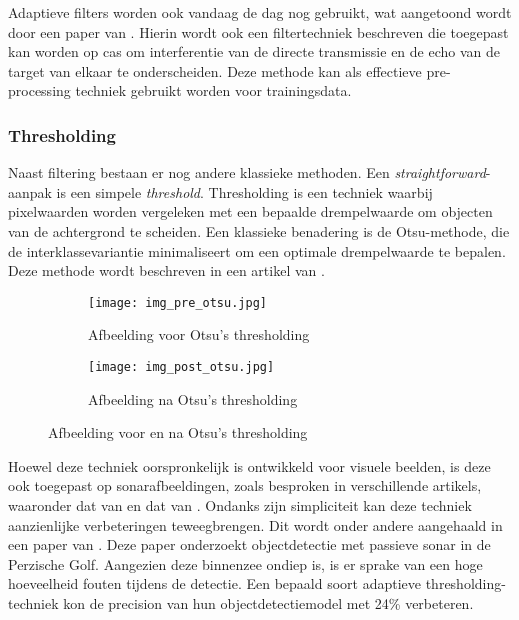 Adaptieve filters worden ook vandaag de dag nog gebruikt, wat aangetoond wordt door een paper van \textcite{Lourey_2017}. Hierin wordt ook een filtertechniek beschreven die toegepast kan worden op \gls{cas} om interferentie van de directe transmissie en de echo van de target van elkaar te onderscheiden. Deze methode kan als effectieve pre-processing techniek gebruikt worden voor trainingsdata.

\subsubsection{Thresholding}

Naast filtering bestaan er nog andere klassieke methoden. Een \emph{straightforward}-aanpak is een simpele \emph{threshold}. Thresholding is een techniek waarbij pixelwaarden worden vergeleken met een bepaalde drempelwaarde om objecten van de achtergrond te scheiden. Een klassieke benadering is de Otsu-methode, die de interklassevariantie minimaliseert om een optimale drempelwaarde te bepalen. Deze methode wordt beschreven in een artikel van \textcite{Otsu_1979}.

\begin{figure}[H]
    \centering
    \begin{subfigure}{.5\textwidth}
        \centering
        \captionsetup{justification=centering}
        \texttt{[image: img\_pre\_otsu.jpg]}
        \caption[Afbeelding voor Otsu's thresholding]{Afbeelding voor Otsu's thresholding}
        \label{fig:img_pre_otsu}
    \end{subfigure}%
    \begin{subfigure}{.5\textwidth}
        \centering
        \captionsetup{justification=centering}
        \texttt{[image: img\_post\_otsu.jpg]}
        \caption[Afbeelding na Otsu's thresholding]{Afbeelding na Otsu's thresholding}
        \label{fig:img_post_otsu}
    \end{subfigure}
    \caption[Afbeelding voor en na Otsu's thresholding]{Afbeelding voor en na Otsu's thresholding}
    \label{fig:imgs_otsu}
\end{figure}

Hoewel deze techniek oorspronkelijk is ontwikkeld voor visuele beelden, is deze ook toegepast op sonarafbeeldingen, zoals besproken in verschillende artikels, waaronder dat van \textcite{Yuan_2016} en dat van \textcite{Dimitrova_Grekow_2017}. Ondanks zijn simpliciteit kan deze techniek aanzienlijke verbeteringen teweegbrengen. Dit wordt onder andere aangehaald in een paper van \textcite{Komari_Alaie_2018}. Deze paper onderzoekt objectdetectie met passieve sonar in de Perzische Golf. Aangezien deze binnenzee ondiep is, is er sprake van een hoge hoeveelheid fouten tijdens de detectie. Een bepaald soort adaptieve thresholding-techniek kon de \gls{precision} van hun objectdetectiemodel met 24\% verbeteren.

